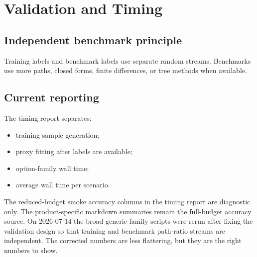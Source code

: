 \documentclass[11pt,oneside]{book}
\theoremstyle{definition}
\begin{document}
\chapter{Validation and Timing}

\section{Independent benchmark principle}
Training labels and benchmark labels use separate random streams. Benchmarks use more paths, closed forms, finite differences, or tree methods when available.

\section{Current reporting}
The timing report separates:
\begin{itemize}
  \item training sample generation;
  \item proxy fitting after labels are available;
  \item option-family wall time;
  \item average wall time per scenario.
\end{itemize}
The reduced-budget smoke accuracy columns in the timing report are diagnostic only. The product-specific markdown summaries remain the full-budget accuracy source. On 2026-07-14 the broad generic-family scripts were rerun after fixing the validation design so that training and benchmark path-ratio streams are independent. The corrected numbers are less flattering, but they are the right numbers to show.
\end{document}
